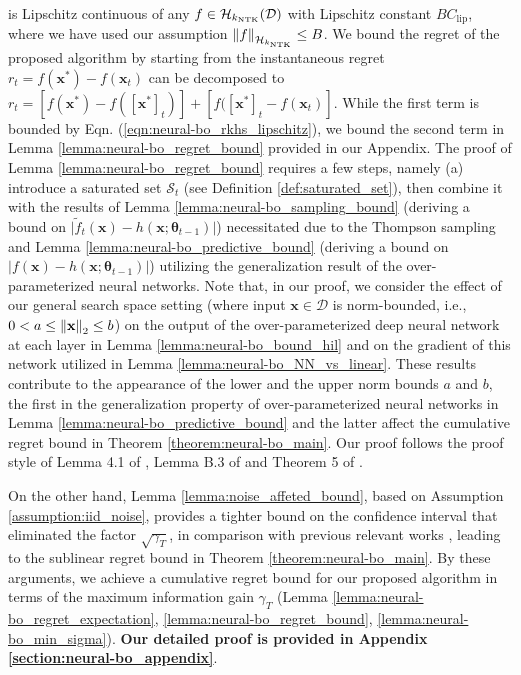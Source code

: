 is Lipschitz continuous of any $f \in \mathcal{H}_{k_\textup{NTK}}(\mathcal{D})$ with Lipschitz constant $B C_{\text{lip}}$, where we have used our assumption $\norm{f}_{\mathcal{H}_{k_\textup{NTK}}} \leq B$. We bound the regret of the proposed algorithm by starting from the instantaneous regret $r_t = f(\mathbf{x}^*) - f(\mathbf{x}_t)$ can be decomposed to $r_t = [f(\mathbf{x}^*) - f([\mathbf{x}^*]_t)] + [f([\mathbf{x}^*]_t - f(\mathbf{x}_t)]$. While the first term is bounded by Eqn. (\ref{eqn:neural-bo_rkhs_lipschitz}),  we bound the second term in Lemma \ref{lemma:neural-bo_regret_bound} provided in our Appendix. The proof of Lemma \ref{lemma:neural-bo_regret_bound} requires a few steps, namely (a) introduce a saturated set $\mathcal S_t$ (see Definition \ref{def:saturated_set}), then combine it with the results of Lemma \ref{lemma:neural-bo_sampling_bound} (deriving a bound on $\lvert \widetilde{f}_t(\mathbf{x}) - h(\mathbf{x}; \boldsymbol{\theta}_{t-1}) \rvert$) necessitated due to the Thompson sampling and Lemma \ref{lemma:neural-bo_predictive_bound} (deriving a bound on $\lvert f(\mathbf{x}) - h(\mathbf{x}; \boldsymbol{\theta}_{t-1}) \rvert$) utilizing the generalization result of the over-parameterized neural networks. Note that, in our proof, we consider the effect of our general search space setting (where input $\mathbf{x} \in \mathcal{D}$ is norm-bounded, i.e.,  $0 < a \le \norm{\mathbf{x}}_2 \le b$) on the output of the over-parameterized deep neural network at each layer in Lemma \ref{lemma:neural-bo_bound_hil} and on the gradient of this network utilized in Lemma \ref{lemma:neural-bo_NN_vs_linear}. These results contribute to the appearance of the lower and the upper norm bounds $a$ and $b$, the first in the generalization property of over-parameterized neural networks in Lemma \ref{lemma:neural-bo_predictive_bound} and the latter affect the cumulative regret bound in Theorem \ref{theorem:neural-bo_main}. Our proof follows the proof style of Lemma 4.1 of \citet{cao2019generalization}, Lemma B.3 of \citet{cao2019generalization} and Theorem 5 
of \citet{allen2019convergence}. 

On the other hand, Lemma \ref{lemma:noise_affeted_bound}, based on Assumption \ref{assumption:iid_noise}, provides a tighter bound on the confidence interval that eliminated the factor $\sqrt{\gamma_T}$, in comparison with previous relevant works \citet{chowdhury2017kernelized, zhou2020neural}, leading to the sublinear regret bound in Theorem \ref{theorem:neural-bo_main}.   
By these arguments, we achieve a cumulative regret bound for our proposed algorithm in terms of the maximum information gain $\gamma_T$ (Lemma \ref{lemma:neural-bo_regret_expectation}, \ref{lemma:neural-bo_regret_bound}, \ref{lemma:neural-bo_min_sigma}). \textbf{Our detailed proof is provided in Appendix \ref{section:neural-bo_appendix}}.

